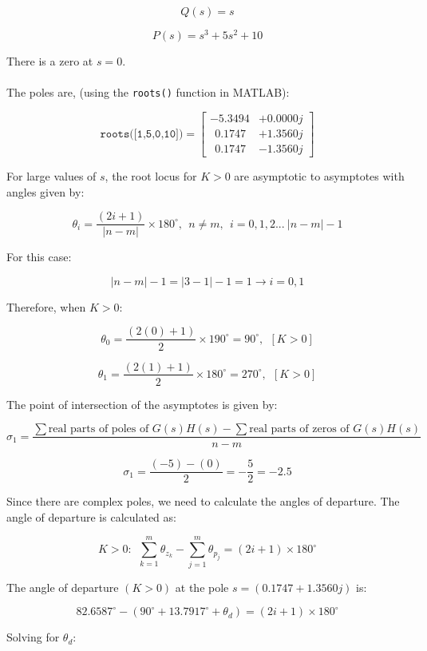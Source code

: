 \documentclass[12pt, letterpaper]{../assignment}
\begin{document}
$$ Q(s) = s $$

$$ P(s) = s^3 + 5 s^2 + 10 $$

There is a zero at $s=0$.
\\\\
The poles are, (using the \texttt{roots()} function in MATLAB):

$$ \texttt{roots([1,5,0,10])} = \left[ \begin{array}{cc} 
    -5.3494 &+ 0.0000j\\
 \ \ 0.1747 &+ 1.3560j\\
 \ \ 0.1747 &- 1.3560j
\end{array} \right] $$

For large values of $s$, the root locus for $K > 0$ are asymptotic to asymptotes with angles
given by:

$$ \theta_i = \frac{(2i+1)}{|n-m|} \times 180^{\circ}, \ \ n \neq m, \ \ i = 0,1,2... \ |n-m|-1$$

For this case:

$$ |n-m|-1 = |3-1|-1 = 1 \rightarrow i = 0,1 $$

Therefore, when $K > 0$:
\begin{answer}
    $$ \theta_0 = \frac{(2(0)+1)}{2} \times 190^{\circ} = 90^{\circ}, \ \ [K > 0] $$
\end{answer}


\begin{answer}
    $$ \theta_1 = \frac{(2(1)+1)}{2} \times 180^{\circ} = 270^{\circ}, \ \ [K > 0] $$
\end{answer}



The point of intersection of the asymptotes is given by:

$$ \sigma_1 = \frac{\sum \text{real parts of poles of } G(s)H(s) - \sum \text{real parts of zeros of } G(s)H(s) }{n-m} $$

$$ \sigma_1 = \frac{(-5) - (0) }{2} = -\frac{5}{2} = -2.5 $$

Since there are complex poles, we need to calculate the angles of departure. The angle of departure is calculated as:

$$ K > 0:  \ \ \sum^m_{k = 1}\theta_{z_k} - \sum^m_{j = 1}\theta_{p_j} = (2i+1)\times 180^{\circ} $$

The angle of departure $(K > 0)$ at the pole $s = (0.1747 + 1.3560j)$ is:

$$ 82.6587^{\circ} - (90^{\circ} + 13.7917^{\circ} + \theta_d) = (2i+1)\times 180^{\circ} $$

Solving for $\theta_d$:
\end{document}
